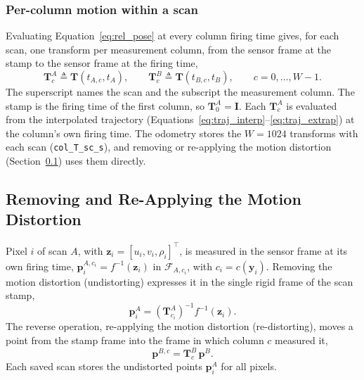 \subsubsection{Per-column motion within a scan}
Evaluating Equation~\eqref{eq:rel_pose} at every column firing time gives, for each scan, one transform per measurement column, from the sensor frame at the stamp to the sensor frame at the firing time,
\begin{equation}
    \label{eq:col_pose}
    \mathbf{T}^{A}_{c} \triangleq \mathbf{T}(t_{A,c}, t_A), \qquad
    \mathbf{T}^{B}_{c} \triangleq \mathbf{T}(t_{B,c}, t_B), \qquad c = 0, \ldots, W-1.
\end{equation}
The superscript names the scan and the subscript the measurement column. The stamp is the firing time of the first column, so $\mathbf{T}^{A}_{0} = \mathbf{I}$. Each $\mathbf{T}^{A}_{c}$ is evaluated from the interpolated trajectory (Equations~\eqref{eq:traj_interp}--\eqref{eq:traj_extrap}) at the column's own firing time. The odometry stores the $W=1024$ transforms with each scan (\texttt{col\_T\_sc\_s}), and removing or re-applying the motion distortion (Section~\ref{sec:mdist}) uses them directly. 

\subsection{Removing and Re-Applying the Motion Distortion}
\label{sec:mdist}
Pixel $i$ of scan $A$, with $\mathbf{z}_i = [u_i, v_i, \rho_i]^{\top}$, is measured in the sensor frame at its own firing time, $\mathbf{p}_i^{A,c_i} = f^{-1}(\mathbf{z}_i)$ in $\mathcal{F}_{A,c_i}$, with $c_i = c(\mathbf{y}_i)$. Removing the motion distortion (undistorting) expresses it in the single rigid frame of the scan stamp,
\begin{equation}
    \label{eq:mdist}
    \mathbf{p}_i^{A} = \left(\mathbf{T}^{A}_{c_i}\right)^{-1} f^{-1}(\mathbf{z}_i).
\end{equation}
The reverse operation, re-applying the motion distortion (re-distorting), moves a point from the stamp frame into the frame in which column $c$ measured it,
\begin{equation}
    \mathbf{p}^{B,c} = \mathbf{T}^{B}_{c}\,\mathbf{p}^{B}.
\end{equation}
Each saved scan stores the undistorted points $\mathbf{p}_i^{A}$ for all pixels.

